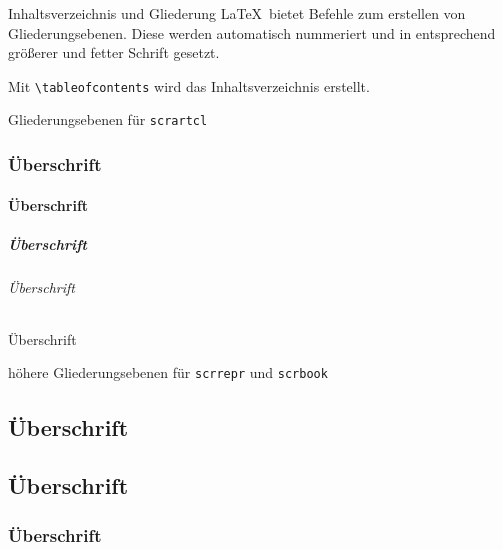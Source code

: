 \begin{frame}[fragile]{Inhaltsverzeichnis und Gliederung}
  \LaTeX\ bietet Befehle zum erstellen von Gliederungsebenen.
  Diese werden automatisch nummeriert und in entsprechend größerer und fetter Schrift gesetzt.

  Mit \verb+\tableofcontents+ wird das Inhaltsverzeichnis erstellt.

  \begin{block}{Gliederungsebenen für \texttt{scrartcl}}
    \begin{lstverbatim}
    \section{Überschrift}
    \subsection{Überschrift}
    \subsubsection{Überschrift}
    \paragraph{Überschrift} %
    \subparagraph{Überschrift} %
    \end{lstverbatim}
  \end{block}
  \begin{block}{höhere Gliederungsebenen für \texttt{scrrepr} und \texttt{scrbook}}
    \begin{lstverbatim}
    \part{Überschrift}
    \chapter{Überschrift}
    \section{Überschrift}
    \end{lstverbatim}
  \end{block}
\end{frame}

